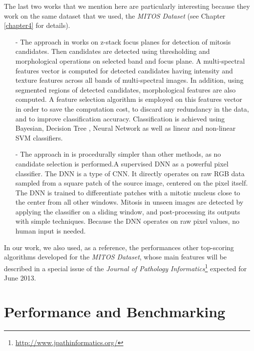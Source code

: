 The last two works that we mention here are particularly interesting because they work on the same dataset that we used, the \textit{MITOS Dataset} (see Chapter \ref{chapter4} for details).

\begin{itemize}
\item[-] The approach in \cite{irshad2013multispectral} works on z-stack focus planes for detection of mitosis candidates.
Then candidates are detected using thresholding and morphological operations on selected band and focus plane.
A multi-spectral features vector is computed for detected candidates having intensity and texture features across all bands
of multi-spectral images. In addition, using segmented regions of detected candidates, morphological features are also computed. A feature selection algorithm
is employed on this features vector in order to save the computation
cost, to discard any redundancy in the data, and to improve classification accuracy.
Classification is achieved using Bayesian, Decision Tree , Neural Network as
well as linear and non-linear \Gls{SVM} classifiers.
 \item[-] The approach in \cite{agNN} is procedurally simpler than other methods, as no candidate selection is performed.A supervised \Gls{DNN} as a powerful pixel classifier.
The \Gls{DNN} is a type of \Gls{CNN}. It directly operates on raw RGB data sampled from a square patch of the source image, centered on the pixel itself. The \Gls{DNN} is trained to
differentiate patches with a mitotic nucleus close to the center from all other windows.
Mitosis in unseen images are detected by applying the classifier on a sliding window, and post-processing its outputs with simple techniques. Because the \Gls{DNN} operates on
raw pixel values, no human input is needed.
\end{itemize}
 
In our work, we also used, as a reference, the performances other top-scoring algorithms developed for the \textit{MITOS Dataset}, whose main features will be described in
a special issue of the \textit{Journal of Pathology Informatics}\footnote{\url{http://www.jpathinformatics.org/}} expected for June 2013.


\vspace{0.5cm}


\section{Performance and Benchmarking}
\label{ch3:perf}

